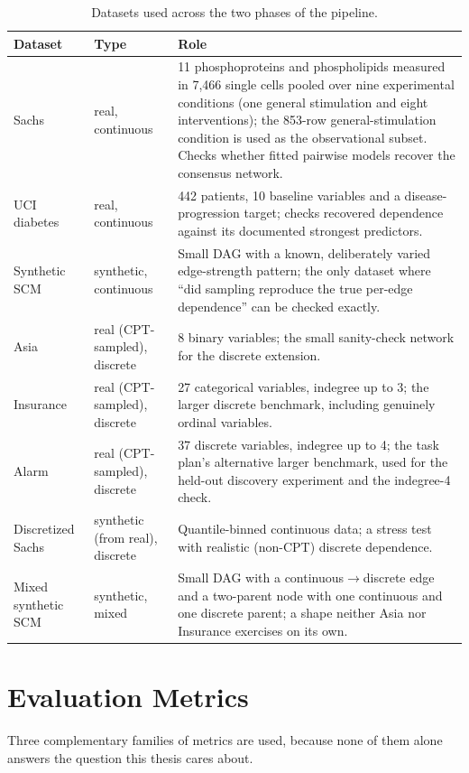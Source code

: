 \documentclass[
  english,
  class=report,
  accentcolor=2c,
  marginpar=false,
  parskip=half-,
  fontsize=11pt,
  ruledheaders=false,
  pdfa=false,
  IMRAD=false,
  thesis={type=master}
]{tudapub}
\begin{document}
\begin{table}[ht]
\caption{Datasets used across the two phases of the pipeline.}
\label{tab:datasets}
\centering
\begin{tabular}{lp{3.1cm}p{6.7cm}}
\toprule
\textbf{Dataset} & \textbf{Type} & \textbf{Role} \\
\midrule
Sachs \parencite{sachs2005} & real, continuous & 11 phosphoproteins and phospholipids measured in 7,466 single cells pooled over nine experimental conditions (one general stimulation and eight interventions); the 853-row general-stimulation condition is used as the observational subset. Checks whether fitted pairwise models recover the consensus network. \\
UCI diabetes \parencite{efron2004} & real, continuous & 442 patients, 10 baseline variables and a disease-progression target; checks recovered dependence against its documented strongest predictors. \\
Synthetic SCM & synthetic, continuous & Small DAG with a known, deliberately varied edge-strength pattern; the only dataset where ``did sampling reproduce the true per-edge dependence'' can be checked exactly. \\
Asia \parencite{lauritzen1988} & real (CPT-sampled), discrete & 8 binary variables; the small sanity-check network for the discrete extension. \\
Insurance \parencite{binder1997} & real (CPT-sampled), discrete & 27 categorical variables, indegree up to 3; the larger discrete benchmark, including genuinely ordinal variables. \\
Alarm \parencite{beinlich1989} & real (CPT-sampled), discrete & 37 discrete variables, indegree up to 4; the task plan's alternative larger benchmark, used for the held-out discovery experiment and the indegree-4 check. \\
Discretized Sachs & synthetic (from real), discrete & Quantile-binned continuous data; a stress test with realistic (non-CPT) discrete dependence. \\
Mixed synthetic SCM & synthetic, mixed & Small DAG with a continuous$\to$discrete edge and a two-parent node with one continuous and one discrete parent; a shape neither Asia nor Insurance exercises on its own. \\
\bottomrule
\end{tabular}
\end{table}

\section{Evaluation Metrics}
Three complementary families of metrics are used, because none of them
alone answers the question this thesis cares about.
\end{document}
